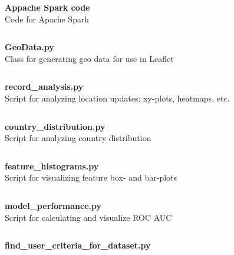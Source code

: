 \newpage
\textbf{\Large Appache Spark code}\\

Code for Apache Spark
\inputminted[mathescape,
               linenos,
               numbersep=5pt,
               gobble=2,
               frame=lines,
               framesep=2mm]{python}{../tools/template_new.py}

\newpage
\textbf{\Large GeoData.py}\\

Class for generating geo data for use in Leaflet
\inputminted[mathescape,
               linenos,
               numbersep=5pt,
               gobble=2,
               frame=lines,
               framesep=2mm]{python}{../tools/GeoData.py}

\newpage
\textbf{\Large record\_analysis.py}\\

Script for analyzing location updates: xy-plots, heatmaps, etc.
\inputminted[mathescape,
               linenos,
               numbersep=5pt,
               gobble=2,
               frame=lines,
               framesep=2mm]{python}{../tools/scripts/records_analysis.py}

\newpage
\textbf{\Large country\_distribution.py}\\

Script for analyzing country distribution
\inputminted[mathescape,
               linenos,
               numbersep=5pt,
               gobble=2,
               frame=lines,
               framesep=2mm]{python}{../tools/scripts/country_distribution.py}

\newpage
\textbf{\Large feature\_histograms.py}\\

Script for visualizing feature box- and bar-plots
\inputminted[mathescape,
               linenos,
               numbersep=5pt,
               gobble=2,
               frame=lines,
               framesep=2mm]{python}{../tools/scripts/feature_histograms.py}

\newpage
\textbf{\Large model\_performance.py}\\

Script for calculating and visualize ROC AUC
\inputminted[mathescape,
               linenos,
               numbersep=5pt,
               gobble=2,
               frame=lines,
               framesep=2mm]{python}{../tools/scripts/model_performance.py}

\newpage
\textbf{\Large find\_user\_criteria\_for\_dataset.py}\\

